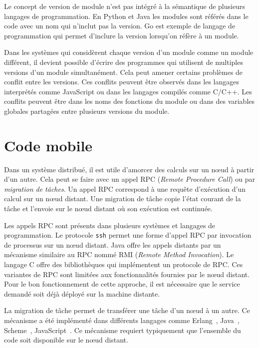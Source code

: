 
Le concept de version de module n'est pas intégré à la sémantique de
plusieurs langages de programmation.  En Python et Java les
modules sont référés dans le code avec un nom qui n'inclut pas la
version.  Go est exemple de langage de programmation qui
permet d'inclure la version lorsqu'on réfère à un module.

Dans les systèmes qui considèrent chaque version d'un module comme un
module différent, il devient possible d'écrire des programmes qui
utilisent de multiples versions d'un module simultanément. Cela peut
amener certains problèmes de conflit entre les versions. Ces conflits
peuvent être observés dans les langages interprétés comme JavaScript
ou dans les langages compilés comme C/C++. Les conflits peuvent être
dans les noms des fonctions du module ou dans des variables globales
partagées entre plusieurs versions du module.


\section{Code mobile}

Dans un système distribué, il est utile d'amorcer des calculs sur un
nœud à partir d'un autre.
Cela peut se faire avec un appel RPC (\textit{Remote
Procedure Call}) ou par \textit{migration de tâches}.  Un appel RPC correspond
à une requête d'exécution d'un calcul sur un nœud distant. Une migration de
tâche copie l'état courant de la tâche et l'envoie sur le nœud distant où son
exécution est continuée.

Les appels RPC sont présents dans plusieurs systèmes et langages de
programmation.  Le protocole \texttt{ssh} permet une forme d'appel RPC par
invocation de processus sur un nœud distant. Java offre les appels distants par un
mécanisme similaire au RPC nommé RMI (\textit{Remote Method Invocation}).
Le langage C offre des bibliothèques qui implémentent un protocole de RPC.
Ces variantes de RPC sont limitées aux fonctionnalités fournies par le nœud distant.
Pour le bon fonctionnement de cette approche, il est nécessaire que le
service demandé soit déjà déployé sur la machine distante.

La migration de tâche permet de transférer une tâche d'un nœud à un autre.  Ce
mécanisme a été implémenté dans différents langages comme
Erlang~\cite{M_mobileintelligent}, Java~\cite{And98transparentmigration},
Scheme~\cite{Sumii00animplementation,DBLP:conf/erlang/Germain06},
JavaScript~\cite{DEV2017transparentmigration}. Ce mécanisme requiert
typiquement que l'ensemble du code soit disponible sur le nœud distant.

